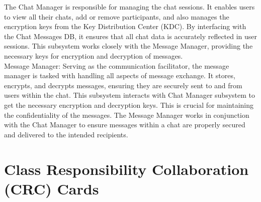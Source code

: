 \documentclass[]{article}
\begin{document}
    The Chat Manager is responsible for managing the chat sessions. It enables users to view all their chats, add or remove participants, and also manages the encryption keys from the Key Distribution Center (KDC). By interfacing with the Chat Messages DB, it ensures that all chat data is accurately reflected in user sessions. This subsystem works closely with the Message Manager, providing the necessary keys for encryption and decryption of messages. \\

    Message Manager: Serving as the communication facilitator, the message manager is tasked with handling all aspects of message exchange. It stores, encrypts, and decrypts messages, ensuring they are securely sent to and from users within the chat. This subsystem interacts with Chat Manager subsystem to get the necessary encryption and decryption keys. This is crucial for maintaining the confidentiality of the messages. The Message Manager works in conjunction with the Chat Manager to ensure messages within a chat are properly secured and delivered to the intended recipients. \\


	
\section{Class Responsibility Collaboration (CRC) Cards}
\label{sec:class_responsibility_collaboration_crc_cards}
\end{document}
